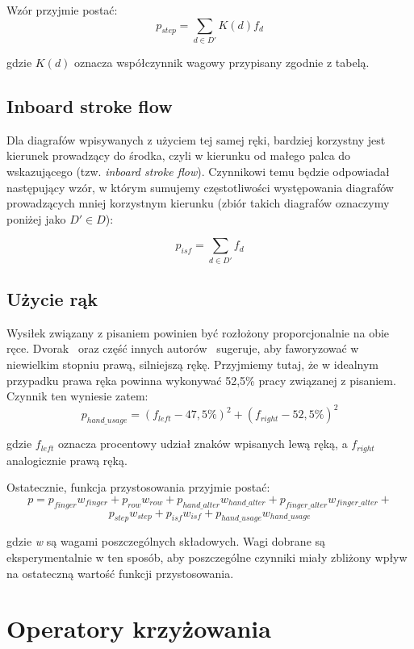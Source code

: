 \documentclass{xmgr}
\begin{document}
Wzór przyjmie postać:
$$ p_{step} = \sum\limits_{d \in D'} K(d) f_d $$

gdzie $K(d)$ oznacza współczynnik wagowy przypisany zgodnie z tabelą.


\subsection{Inboard stroke flow}

Dla diagrafów wpisywanych z użyciem tej samej ręki, bardziej korzystny jest kierunek prowadzący do środka, czyli w kierunku od małego palca do wskazującego (tzw. \emph{inboard stroke flow}). Czynnikowi temu będzie odpowiadał następujący wzór, w którym sumujemy częstotliwości występowania diagrafów prowadzących mniej korzystnym kierunku (zbiór takich diagrafów oznaczymy poniżej jako $ D' \in D $):

$$ p_{isf} = \sum\limits_{d \in D'} f_d $$


\subsection{Użycie rąk}

Wysiłek związany z pisaniem powinien być rozłożony proporcjonalnie na obie ręce. Dvorak~\cite{cassingham1986dvorak} oraz część innych autorów~\cite{Call:2005:CME} sugeruje, aby faworyzować w niewielkim stopniu prawą, silniejszą rękę. Przyjmiemy tutaj, że w idealnym przypadku prawa ręka powinna wykonywać 52,5\% pracy związanej z pisaniem. Czynnik ten wyniesie zatem:
$$ p_{hand\_usage} = (f_{left} - 47,5\%)^2 + (f_{right} - 52,5\%)^2 $$

gdzie $f_{left}$ oznacza procentowy udział znaków wpisanych lewą ręką, a $f_{right}$ analogicznie prawą ręką.\newline\newline


\noindent Ostatecznie, funkcja przystosowania przyjmie postać:
$$ p = p_{finger} w_{finger} + p_{row} w_{row} + p_{hand\_alter} w_{hand\_alter} + p_{finger\_alter} w_{finger\_alter} + $$
$$ p_{step} w_{step} + p_{isf} w_{isf} + p_{hand\_usage} w_{hand\_usage} $$

\noindent
gdzie \emph{w} są wagami poszczególnych składowych. Wagi dobrane są eksperymentalnie w ten sposób, aby poszczególne czynniki miały zbliżony wpływ na ostateczną wartość funkcji przystosowania.


\section{Operatory krzyżowania}
\end{document}
